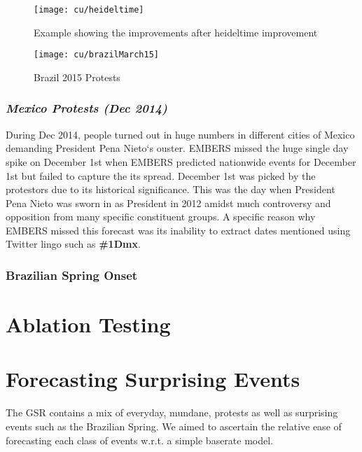 \begin{figure}
\texttt{[image: cu/heideltime]}
\caption{Example showing the improvements after heideltime improvement}
\label{fig:heideltime}
\end{figure}


\begin{figure}[H]
\centering
\texttt{[image: cu/brazilMarch15]}
\caption{Brazil 2015 Protests}
\label{fig:brazilSpring}
\end{figure}

\subsubsection{\it Mexico Protests (Dec 2014)}
During Dec 2014, people turned out in huge numbers in different cities of Mexico demanding
President Pena Nieto`s ouster. 
EMBERS missed the huge single day spike on December 1st when
EMBERS predicted nationwide events for December 1st but failed to
capture the its spread.  
December 1st was picked by the protestors due to
its historical significance. This was the day when President Pena Nieto was sworn
in as President in 2012 amidst much controversy and opposition from
many specific constituent groups. A specific reason why EMBERS missed this forecast
was its inability to extract dates mentioned using Twitter lingo such as {\bf \#1Dmx}.

\subsubsection{Brazilian Spring Onset}

\section{Ablation Testing}

\section{Forecasting Surprising Events}
The GSR contains a mix of everyday, mundane, protests as well as surprising events such as the Brazilian Spring.
We aimed to ascertain the relative ease of forecasting each class of events w.r.t. a simple baserate model.

